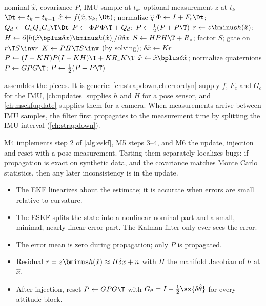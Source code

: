 \begin{algorithm}[t]
\caption{Error-state Kalman filter (one IMU step and an optional update)}
\label{alg:eskf}
\begin{algorithmic}[1]
\Require nominal $\hat x$, covariance $P$, IMU sample at $t_k$, optional measurement $z$ at $t_k$
\State $\Dt \gets t_k - t_{k-1}$ 
\State $\hat x \gets f(\hat x, u_k, \Dt)$; normalize $\hat q$ 
\State $\Phi \gets I + F_c\Dt$; \quad $Q_d \gets G_cQ_cG_c\T\Dt$
\State $P \gets \Phi P\Phi\T + Q_d$; \quad $P \gets \tfrac12(P + P\T)$
  \State $r \gets z\bminus h(\hat x)$; \quad $H \gets \partial[h(\hat x\bplus\delta x)\bminus h(\hat x)]/\partial\delta x$
  \State $S \gets HPH\T + R_z$; factor $S$; gate on $r\T S\inv r$
  \State $K \gets PH\T S\inv$ (by solving); \quad $\delta\hat x \gets Kr$
  \State $P \gets (I-KH)P(I-KH)\T + KR_zK\T$
  \State $\hat x \gets \hat x\bplus\delta\hat x$; normalize quaternions 
  \State $P \gets GPG\T$; \quad $P \gets \tfrac12(P + P\T)$ 
\EndIf
\end{algorithmic}
\end{algorithm}

 assembles the pieces. It is generic: \cref{ch:strapdown,ch:errordyn} supply $f$, $F_c$ and $G_c$
for the IMU, \cref{ch:updates} supplies $h$ and $H$ for a pose sensor, and \cref{ch:msckfupdate} supplies them for
a camera. When measurements arrive between IMU samples, the filter first propagates to the measurement time
by splitting the IMU interval (\cref{ch:strapdown}).

\begin{projectlink}[Milestones 4--6]
M4 implements step 2 of \cref{alg:eskf}, M5 steps 3--4, and M6 the update, injection and reset with a pose
measurement. Testing them separately localizes bugs: if propagation is exact on synthetic data, and the
covariance matches Monte Carlo statistics, then any later inconsistency is in the update.
\end{projectlink}

\begin{takeaways}
\begin{itemize}
  \item The EKF linearizes about the estimate; it is accurate when errors are small relative to curvature.
  \item The ESKF splits the state into a nonlinear nominal part and a small, minimal, nearly linear error
        part. The Kalman filter only ever sees the error.
  \item The error mean is zero during propagation; only $P$ is propagated.
  \item Residual $r = z\bminus h(\hat x) \approx H\delta x + n$ with $H$ the manifold Jacobian of $h$ at $\hat x$.
  \item After injection, reset $P \gets GPG\T$ with $G_\theta = I - \tfrac12\sx{\delta\hat\theta}$ for every attitude block.
\end{itemize}
\end{takeaways}

